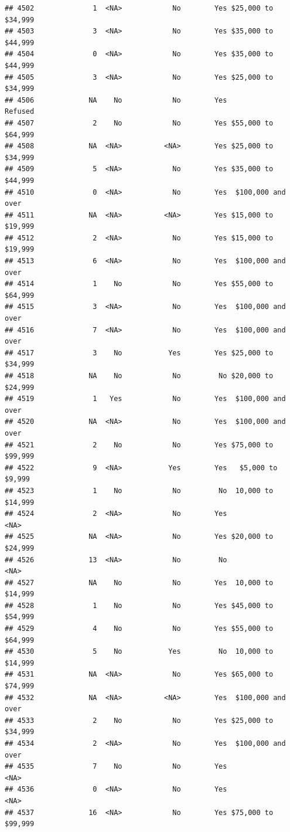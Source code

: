 \documentclass[man]{apa6}
\begin{document}
\begin{verbatim}
## 4502              1  <NA>            No        Yes $25,000 to $34,999
## 4503              3  <NA>            No        Yes $35,000 to $44,999
## 4504              0  <NA>            No        Yes $35,000 to $44,999
## 4505              3  <NA>            No        Yes $25,000 to $34,999
## 4506             NA    No            No        Yes            Refused
## 4507              2    No            No        Yes $55,000 to $64,999
## 4508             NA  <NA>          <NA>        Yes $25,000 to $34,999
## 4509              5  <NA>            No        Yes $35,000 to $44,999
## 4510              0  <NA>            No        Yes  $100,000 and over
## 4511             NA  <NA>          <NA>        Yes $15,000 to $19,999
## 4512              2  <NA>            No        Yes $15,000 to $19,999
## 4513              6  <NA>            No        Yes  $100,000 and over
## 4514              1    No            No        Yes $55,000 to $64,999
## 4515              3  <NA>            No        Yes  $100,000 and over
## 4516              7  <NA>            No        Yes  $100,000 and over
## 4517              3    No           Yes        Yes $25,000 to $34,999
## 4518             NA    No            No         No $20,000 to $24,999
## 4519              1   Yes            No        Yes  $100,000 and over
## 4520             NA  <NA>            No        Yes  $100,000 and over
## 4521              2    No            No        Yes $75,000 to $99,999
## 4522              9  <NA>           Yes        Yes   $5,000 to $9,999
## 4523              1    No            No         No  10,000 to $14,999
## 4524              2  <NA>            No        Yes               <NA>
## 4525             NA  <NA>            No        Yes $20,000 to $24,999
## 4526             13  <NA>            No         No               <NA>
## 4527             NA    No            No        Yes  10,000 to $14,999
## 4528              1    No            No        Yes $45,000 to $54,999
## 4529              4    No            No        Yes $55,000 to $64,999
## 4530              5    No           Yes         No  10,000 to $14,999
## 4531             NA  <NA>            No        Yes $65,000 to $74,999
## 4532             NA  <NA>          <NA>        Yes  $100,000 and over
## 4533              2    No            No        Yes $25,000 to $34,999
## 4534              2  <NA>            No        Yes  $100,000 and over
## 4535              7    No            No        Yes               <NA>
## 4536              0  <NA>            No        Yes               <NA>
## 4537             16  <NA>            No        Yes $75,000 to $99,999

\end{verbatim}
\end{document}

